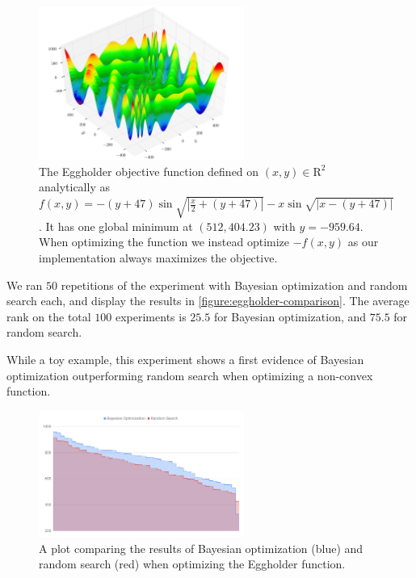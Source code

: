\begin{figure}[h!]
	\begin{center}
		\includegraphics[width=0.6\textwidth]{images/eggholder.png}
    \caption{The Eggholder objective function defined on $(x, y) \in
    \mathrm{R}^2$ analytically as $f(x, y) = -(y + 47) \sin \sqrt{| \frac{x}{2}
      + (y + 47)|} - x \sin \sqrt{| x - (y + 47)|} $. It has one global minimum at
    $(512, 404.23)$ with $y = -959.64$. When optimizing the function we instead
    optimize $-f(x,y)$ as our implementation always maximizes the objective.}
		\label{figure:eggholder}
	\end{center}
\end{figure}

We ran $50$ repetitions of the experiment with Bayesian optimization and random
search each, and display the results in \autoref{figure:eggholder-comparison}.
The average rank on the total $100$ experiments is $25.5$ for Bayesian
optimization, and $75.5$ for random search.

While a toy example, this experiment shows a first evidence of Bayesian
optimization outperforming random search when optimizing a non-convex function.

\begin{figure}
	\begin{center}
		\includegraphics[width=0.6\textwidth]{images/eggholder-comparison.png}
		\caption{A plot comparing the results of Bayesian optimization (blue) and random search (red) when optimizing the Eggholder function.}
		\label{figure:eggholder-comparison}
	\end{center}
\end{figure}

